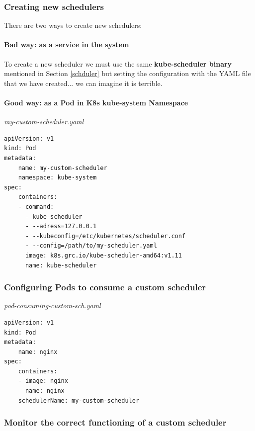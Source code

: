 \documentclass{article}
\newenvironment{codetemplate}[1][]{%
  \mybasecolorbox[#1]
  \itshape
}{%
  \endmybasecolorbox
}
\begin{document}
\subsubsection{Creating new schedulers}

There are two ways to create new schedulers:

\paragraph{Bad way: as a service in the system}

To create a new scheduler we must use the same \textbf{kube-scheduler binary} mentioned in Section \ref{schduler} but setting the configuration with the YAML file that we have created... we can imagine it is terrible.

\paragraph{Good way: as a Pod in K8s kube-system Namespace}

\begin{codetemplate}{my-custom-scheduler.yaml}
\begin{verbatim}
apiVersion: v1
kind: Pod
metadata:
    name: my-custom-scheduler
    namespace: kube-system
spec:
    containers:
    - command:
      - kube-scheduler
      - --adress=127.0.0.1
      - --kubeconfig=/etc/kubernetes/scheduler.conf
      - --config=/path/to/my-scheduler.yaml
      image: k8s.grc.io/kube-scheduler-amd64:v1.11
      name: kube-scheduler
\end{verbatim}
\end{codetemplate}

\subsubsection{Configuring Pods to consume a custom scheduler}

\begin{codetemplate}{pod-consuming-custom-sch.yaml}
\begin{verbatim}
apiVersion: v1
kind: Pod
metadata:
    name: nginx
spec:
    containers:
    - image: nginx
      name: nginx
    schedulerName: my-custom-scheduler
\end{verbatim}
\end{codetemplate}

\subsubsection{Monitor the correct functioning of a custom scheduler}
\end{document}
